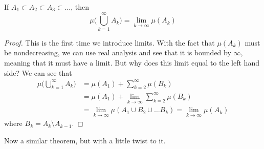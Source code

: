   \begin{proposition}
    If $A_1 \subset A_2 \subset A_3 \subset \ldots$, then 
    \begin{equation}
      \mu\bigg( \bigcup_{k=1}^\infty A_k \bigg) = \lim_{k \rightarrow \infty} \mu(A_k)
    \end{equation}
  \end{proposition}
  \begin{proof}
    This is the first time we introduce limits. With the fact that $\mu(A_k)$ must be nondecreasing, we can use real analysis and see that it is bounded by $\infty$, meaning that it must have a limit. But why does this limit equal to the left hand side? We can see that 
    \begin{align}
      \mu\bigg( \bigcup_{k=1}^\infty A_k \bigg) & = \mu(A_1) + \sum_{k=2}^\infty \mu(B_k) \\
      & = \mu(A_1) + \lim_{k \rightarrow \infty} \sum_{k=2}^\infty \mu(B_k) \\
      & = \lim_{k \rightarrow \infty} \mu(A_1 \cup B_2 \cup \ldots B_k)  = \lim_{k \rightarrow \infty} \mu(A_k) 
    \end{align}
    where $B_k = A_k \setminus A_{k-1}$. 
  \end{proof}

  Now a similar theorem, but with a little twist to it. 

